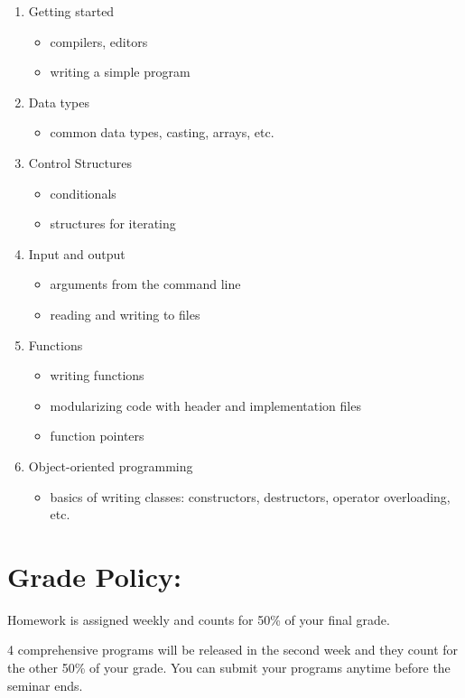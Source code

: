 \documentclass[11pt]{article}
\begin{document}
\begin{enumerate}
\item Getting started
\begin{itemize}
\item compilers, editors
\item writing a simple program
\end{itemize}
\item Data types
\begin{itemize}
\item common data types, casting, arrays, etc.
\end{itemize}
\item Control Structures
\begin{itemize}
\item conditionals
\item structures for iterating
\end{itemize}
\item Input and output
\begin{itemize}
\item arguments from the command line
\item reading and writing to files
\end{itemize}
\item Functions
\begin{itemize}
\item writing functions
\item modularizing code with header and implementation files
\item function pointers
\end{itemize}
\item Object-oriented programming
\begin{itemize}
\item basics of writing classes: constructors, destructors, operator overloading, etc.
\end{itemize}
\end{enumerate}

\section*{Grade Policy:}
\label{sec-5}

Homework is assigned weekly and counts for 50\% of your final grade.

4 comprehensive programs will be released in the second week and they count for
the other 50\% of your grade. You can submit your programs anytime before the seminar
ends.
\end{document}
